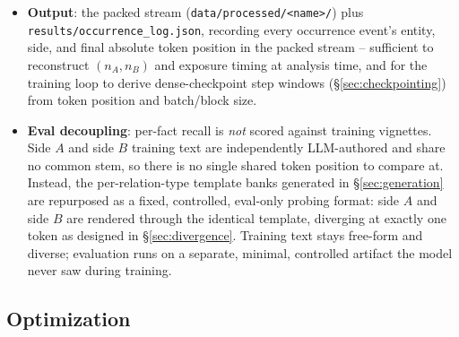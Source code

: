 \documentclass[11pt]{article}
\begin{document}
\begin{itemize}
    repeats until that side's bank (\texttt{v\_a} or \texttt{v\_b}
    variants, 8 total per entity split unevenly per \S\ref{sec:entity}) is
    exhausted, then reshuffled. Heavy repetition is expected and accepted:
    at the high-occurrence side of an extreme split (e.g.\ $(77,3)$'s
    77-occurrence side with 7 variants), each paragraph is reused
    $\approx$11 times over that entity's exposure history. This is an
    explicit cost/API-budget tradeoff against \citet{allenzhu2024capacity}'s
    bioR anchor of 40 variants/entity.
  \item \textbf{Output}: the packed stream (\texttt{data/processed/<name>/})
    plus \texttt{results/occurrence\_log.json}, recording every occurrence
    event's entity, side, and final absolute token position in the packed
    stream -- sufficient to reconstruct $(n_A, n_B)$ and exposure timing at
    analysis time, and for the training loop to derive dense-checkpoint step
    windows (\S\ref{sec:checkpointing}) from token position and batch/block
    size.
  \item \textbf{Eval decoupling}: per-fact recall is \emph{not} scored
    against training vignettes. Side $A$ and side $B$ training text are
    independently LLM-authored and share no common stem, so there is no
    single shared token position to compare at. Instead, the
    per-relation-type template banks generated in \S\ref{sec:generation} are
    repurposed as a fixed, controlled, eval-only probing format: side $A$
    and side $B$ are rendered through the identical template, diverging at
    exactly one token as designed in \S\ref{sec:divergence}. Training text
    stays free-form and diverse; evaluation runs on a separate, minimal,
    controlled artifact the model never saw during training.
\end{itemize}

\subsection{Optimization}
\label{sec:optimization}
\end{document}
